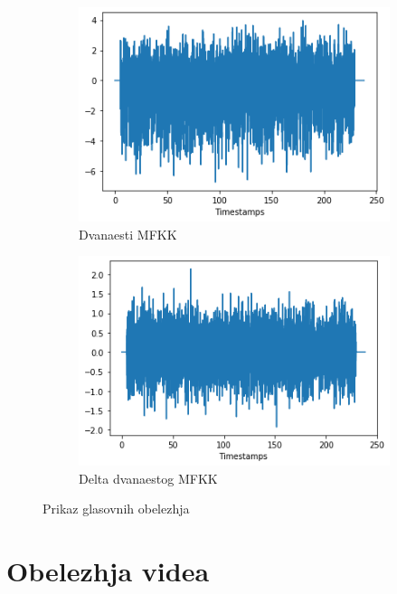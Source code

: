 \documentclass[a4paper, openany, oneside, 11pt]{book}
\begin{document}
\begin{figure}[!h]
        \centering
        \begin{subfigure}{0.475\textwidth}
            \centering
            \includegraphics[scale=0.5]{res/cep12.png}
            \caption{Dvanaesti MFKK}
            \label{fig:6a}
            \vspace{0pt}
        \end{subfigure}%
        \begin{subfigure}{0.475\textwidth}
            \centering
            \includegraphics[scale=0.5]{res/Dcep12.png}
            \caption{Delta dvanaestog MFKK}
            \label{fig:6b}
            \vspace{0pt}
        \end{subfigure}
        \caption{Prikaz glasovnih obelezhja}
        \label{fig:6}
\end{figure}

\chapter{Obelezhja videa}
\end{document}
